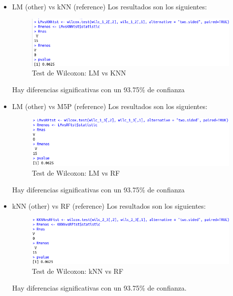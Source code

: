 \begin{itemize}
	\item LM (other) vs kNN (reference)
	Los resultados son los siguientes:
	
	\begin{figure}[H] %
		\centering
		\includegraphics[scale=0.6]{lmknn3.png}  %
		\caption{Test de Wilcoxon: LM vs KNN} 
		\label{fig:lmknn3}
	\end{figure}
	Hay diferencias significativas con un 93.75\% de confianza
	
	\item LM (other) vs M5P (reference)
	Los resultados son los siguientes:
	\begin{figure}[H] %
		\centering
		\includegraphics[scale=0.6]{lmrf3.png}  %
		\caption{Test de Wilcoxon: LM vs RF} 
		\label{fig:lmrf3}
	\end{figure}
	
	Hay diferencias significativas con un 93.75\% de confianza
	
	\item kNN (other) vs RF (reference)
	Los resultados son los siguientes:
	\begin{figure}[H] %
		\centering
		\includegraphics[scale=0.6]{knnrf3.png}  %
		\caption{Test de Wilcoxon: kNN vs RF} 
		\label{fig:knnrf3}
	\end{figure}
	Hay diferencias significativas con un 93.75\% de confianza.
\end{itemize}

